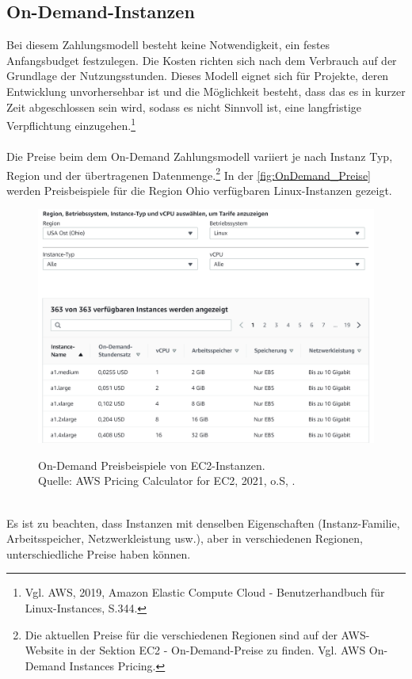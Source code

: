 \subsection{On-Demand-Instanzen}
Bei diesem Zahlungsmodell besteht keine Notwendigkeit, ein festes Anfangsbudget festzulegen. Die Kosten richten sich nach dem Verbrauch auf der Grundlage der Nutzungsstunden. Dieses Modell eignet sich für Projekte, deren Entwicklung unvorhersehbar ist und die Möglichkeit besteht, dass das es in kurzer Zeit abgeschlossen sein wird, sodass es nicht Sinnvoll ist, eine langfristige Verpflichtung einzugehen.\footnote{Vgl. AWS, 2019, Amazon Elastic Compute Cloud - Benutzerhandbuch für Linux-Instances, S.344\cite{AMZ26}.}
\\\\
Die Preise beim dem On-Demand Zahlungsmodell variiert je nach Instanz Typ, Region und der übertragenen Datenmenge.\footnote{Die aktuellen Preise für die verschiedenen Regionen sind auf der AWS-Website in der Sektion EC2 - On-Demand-Preise zu finden. Vgl. AWS On-Demand Instances Pricing.\cite{AMZ02}} In der \autoref{fig:OnDemand_Preise} werden Preisbeispiele für die Region Ohio verfügbaren Linux-Instanzen gezeigt.\\
\begin{figure}[h!]
    \centering
    \includegraphics[scale=0.5]{sources/On-Demand-Pläne für Amazon EC2}\label{fig:OnDemand_Preise}\\
    \caption[On-Demand Preise für Amazon EC2]{}
    \label{fig:OnDemand_Preise}  
    On-Demand Preisbeispiele von EC2-Instanzen.\\
    Quelle: AWS Pricing Calculator for EC2, 2021, o.S, \cite{AMZ02}.
  \end{figure}
\\
Es ist zu beachten, dass Instanzen mit denselben Eigenschaften (Instanz-Familie, Arbeitsspeicher, Netzwerkleistung usw.), aber in verschiedenen Regionen, unterschiedliche Preise haben können.
